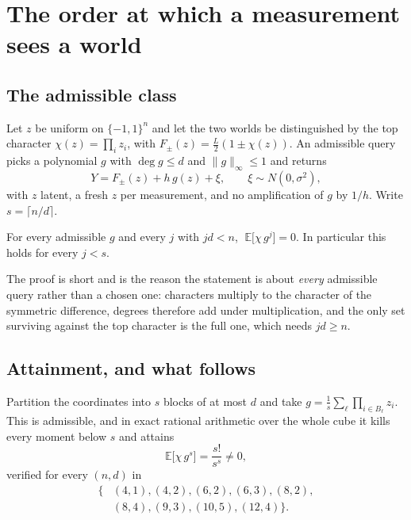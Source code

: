 \section{The order at which a measurement sees a world}
\label{sec:query}

\subsection{The admissible class}

Let $z$ be uniform on $\{-1,1\}^{n}$ and let the two worlds be distinguished by the top
character $\chi(z)=\prod_{i}z_{i}$, with $F_{\pm}(z)=\tfrac{L}{2}(1\pm\chi(z))$. An
admissible query picks a polynomial $g$ with $\deg g\le d$ and $\|g\|_{\infty}\le1$ and
returns
\begin{equation}
Y=F_{\pm}(z)+h\,g(z)+\xi,\qquad \xi\sim N(0,\sigma^{2}),
\label{eq:querymodel}
\end{equation}
with $z$ latent, a fresh $z$ per measurement, and no amplification of $g$ by $1/h$. Write
$s=\lceil n/d\rceil$.

\begin{theorem}
\label{thm:vanish}
For every admissible $g$ and every $j$ with $jd<n$,
$\;\mathbb{E}\bigl[\chi\,g^{j}\bigr]=0$. In particular this holds for every $j<s$.
\end{theorem}


The proof is short and is the reason the statement is about \emph{every} admissible query
rather than a chosen one: characters multiply to the character of the symmetric difference,
degrees therefore add under multiplication, and the only set surviving against the top
character is the full one, which needs $jd\ge n$.


\subsection{Attainment, and what follows}

Partition the coordinates into $s$ blocks of at most $d$ and take
$g=\tfrac1s\sum_{\ell}\prod_{i\in B_{\ell}}z_{i}$. This is admissible, and in exact
rational arithmetic over the whole cube it kills every moment below $s$ and attains
\begin{equation}
\mathbb{E}\bigl[\chi\,g^{s}\bigr]=\frac{s!}{s^{s}}\neq0 ,
\label{eq:attain}
\end{equation}
verified for every $(n,d)$ in
\begin{equation*}
\begin{aligned}
\{&(4,1),(4,2),(6,2),(6,3),(8,2),\\
 &(8,4),(9,3),(10,5),(12,4)\}.
\end{aligned}
\end{equation*}
\CERT{}

